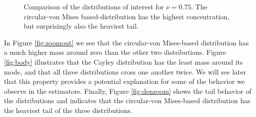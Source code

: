 
\begin{figure}[h!]
\centering
{}
\caption{Comparison of the distributions of interest for $\nu=0.75$.  The circular-von Mises based-distribution has the highest concentration, but surprisingly also the heaviest tail.}
\label{fig:Haar}
\end{figure}

In Figure \ref{fig:zoomout} we see that the circular-von Mises-based distribution has a much higher mass around zero than the other two distributions.  Figure \ref{fig:body} illustrates that the Cayley distribution has the least mass around its mode, and that all three distributions cross one another twice.  We will see later that this property provides a potential explanation for some of the behavior we observe in the estimators. Finally, Figure \ref{fig:denzoom} shows the tail behavior of the distributions and indicates that the circular-von Mises-based distribution has the heaviest tail of the three distributions. 

